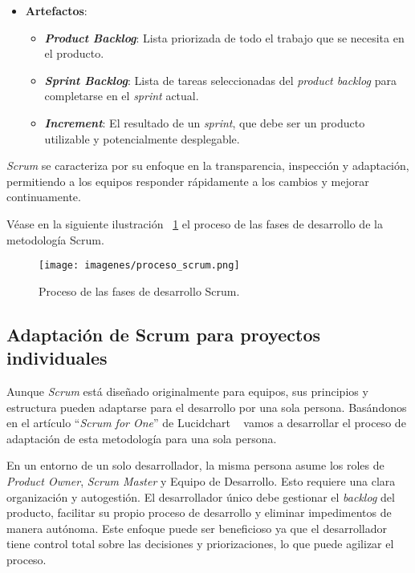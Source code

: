 \begin{itemize}
\begin{itemize}
    \end{itemize}
    \item\textbf{Artefactos}:
    \begin{itemize}

        \item\textbf{\textit{Product Backlog}}: Lista priorizada de todo el trabajo que se necesita en el producto.
        \item\textbf{\textit{Sprint Backlog}}: Lista de tareas seleccionadas del \textit{product backlog} para completarse en el \textit{sprint} actual.
        \item\textbf{\textit{Increment}}: El resultado de un \textit{sprint}, que debe ser un producto utilizable y potencialmente desplegable.
          
    \end{itemize}
   
\end{itemize}

\textit{Scrum} se caracteriza por su enfoque en la transparencia, inspección y
adaptación, permitiendo a los equipos responder rápidamente a los cambios y mejorar continuamente.

Véase en la siguiente ilustración ~\ref{Fig.FasesSCRUM} el proceso de las fases de desarrollo de la metodología Scrum.

\begin{figure}[ht!]
  \centering
  \texttt{[image: imagenes/proceso\_scrum.png]}
  \caption{Proceso de las fases de desarrollo Scrum.}
  \label{Fig.FasesSCRUM}
\end{figure}

\subsection{Adaptación de Scrum para proyectos individuales}
Aunque \textit{Scrum} está diseñado originalmente para equipos, sus principios y
estructura pueden adaptarse para el desarrollo por una sola persona. Basándonos en el artículo “\textit{Scrum for One}” de Lucidchart ~\cite{lucidchartScrumForOne} vamos a desarrollar el proceso de adaptación de esta metodología para una sola persona. 

En un entorno de un solo desarrollador, la misma persona asume los roles de \textit{Product Owner}, \textit{Scrum Master} y Equipo de Desarrollo. Esto requiere una clara organización y autogestión. El desarrollador único debe gestionar el \textit{backlog} del producto, facilitar su propio proceso de desarrollo y eliminar impedimentos de manera autónoma. Este enfoque puede ser beneficioso ya que el desarrollador tiene control total sobre las decisiones y priorizaciones, lo que puede agilizar el proceso. 

